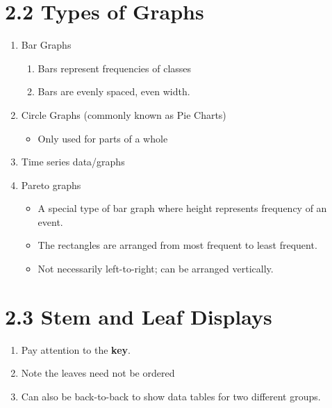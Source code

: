 \documentclass{article}
\begin{document}
\section*{2.2 Types of Graphs}

\begin{enumerate}

    \item Bar Graphs
        \begin{enumerate}
            \item Bars represent frequencies of classes
            \item Bars are evenly spaced, even width.
        \end{enumerate}
    
    \item Circle Graphs (commonly known as Pie Charts)
    
        \begin{itemize}
        
            \item Only used for parts of a whole
            
        \end{itemize}
        
    \item Time series data/graphs
    
    \item Pareto graphs
    
        \begin{itemize}
        
            \item A special type of bar graph where height represents frequency of an event.
            
            \item The rectangles are arranged from most frequent to least frequent.
            
            \item Not necessarily left-to-right; can be arranged vertically.
            
        \end{itemize}
        
\end{enumerate}

\section*{2.3 Stem and Leaf Displays}

\begin{enumerate}

    \item Pay attention to the {\bf key}.
    
    \item Note the leaves need not be ordered
    
    \item Can also be back-to-back to show data tables for two different groups.
    
\end{enumerate}
\end{document}
